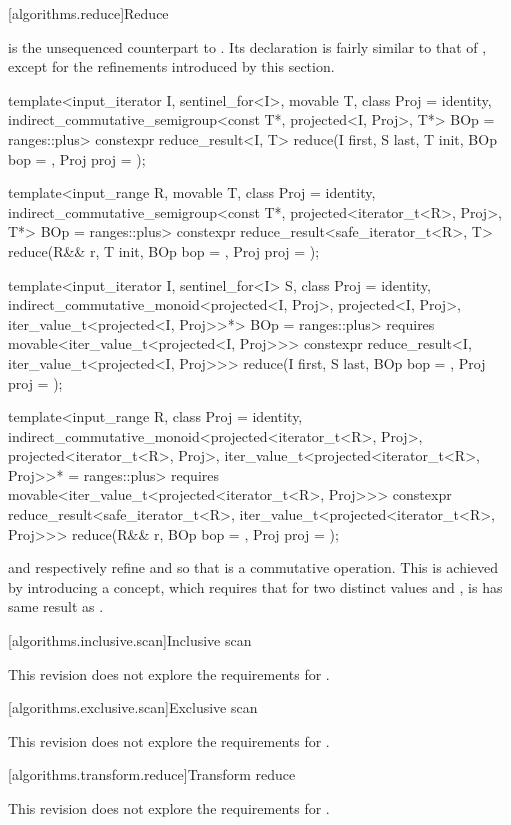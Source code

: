 [algorithms.reduce]{Reduce}

 is the unsequenced counterpart to . Its declaration is fairly
similar to that of , except for the refinements introduced by this section.

\begin{codeblock}
template<input_iterator I, sentinel_for<I>, movable T, class Proj = identity,
         indirect_commutative_semigroup<const T*, projected<I, Proj>, T*> BOp = ranges::plus>
constexpr reduce_result<I, T>
  reduce(I first, S last, T init, BOp bop = {}, Proj proj = {});

template<input_range R, movable T, class Proj = identity,
         indirect_commutative_semigroup<const T*,
                                        projected<iterator_t<R>, Proj>, T*> BOp = ranges::plus>
constexpr reduce_result<safe_iterator_t<R>, T>
  reduce(R&& r, T init, BOp bop = {}, Proj proj = {});

template<input_iterator I, sentinel_for<I> S, class Proj = identity,
         indirect_commutative_monoid<projected<I, Proj>, projected<I, Proj>,
                                     iter_value_t<projected<I, Proj>>*> BOp = ranges::plus>
requires movable<iter_value_t<projected<I, Proj>>>
constexpr reduce_result<I, iter_value_t<projected<I, Proj>>>
  reduce(I first, S last, BOp bop = {}, Proj proj = {});

template<input_range R, class Proj = identity,
         indirect_commutative_monoid<projected<iterator_t<R>, Proj>,
                                     projected<iterator_t<R>, Proj>,
                                     iter_value_t<projected<iterator_t<R>, Proj>>* = ranges::plus>
requires movable<iter_value_t<projected<iterator_t<R>, Proj>>>
constexpr reduce_result<safe_iterator_t<R>, iter_value_t<projected<iterator_t<R>, Proj>>>
  reduce(R&& r, BOp bop = {}, Proj proj = {});
\end{codeblock}

 and  respectively refine 
and  so that  is a commutative operation. This is achieved by introducing a
 concept, which requires that for two distinct values  and
,  is has same result as .


[algorithms.inclusive.scan]{Inclusive scan}

This revision does not explore the requirements for .

[algorithms.exclusive.scan]{Exclusive scan}

This revision does not explore the requirements for .

[algorithms.transform.reduce]{Transform reduce}

This revision does not explore the requirements for .
